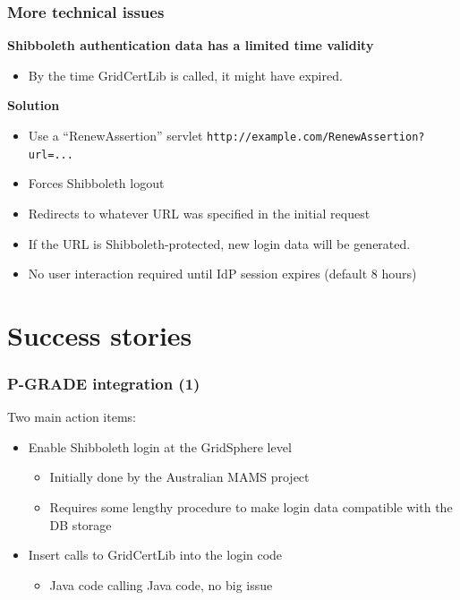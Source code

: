 \documentclass{beamer}
\newcommand{\+}{\vspace{1em}}
\begin{document}
\begin{frame}
  \frametitle{More technical issues}
  
  \textbf{Shibboleth authentication data has a limited time validity}
  \begin{itemize}
  \item By the time GridCertLib is called, it might have expired.
  \end{itemize}

  \+
  \textbf{Solution}
  \begin{itemize}
  \item Use a ``RenewAssertion'' servlet \texttt{http://example.com/RenewAssertion?url=...}
  \item Forces Shibboleth logout
  \item Redirects to whatever URL was specified in the initial request
  \item If the URL is Shibboleth-protected, new login data will be generated.
  \item No user interaction required until IdP session expires
    (default 8 hours)
  \end{itemize}
\end{frame}


\section[Implementation]{Success stories}

\begin{frame}
  \frametitle{P-GRADE integration (1)}

  Two main action items:
  \begin{itemize}
  \item Enable Shibboleth login at the GridSphere level
    \begin{itemize}
    \item Initially done by the Australian MAMS project
    \item Requires some lengthy procedure to make login data
      compatible with the DB storage
    \end{itemize}
  \item Insert calls to GridCertLib into the login code
    \begin{itemize}
    \item Java code calling Java code, no big issue
    \end{itemize}
  \end{itemize}
\end{frame}
\end{document}
